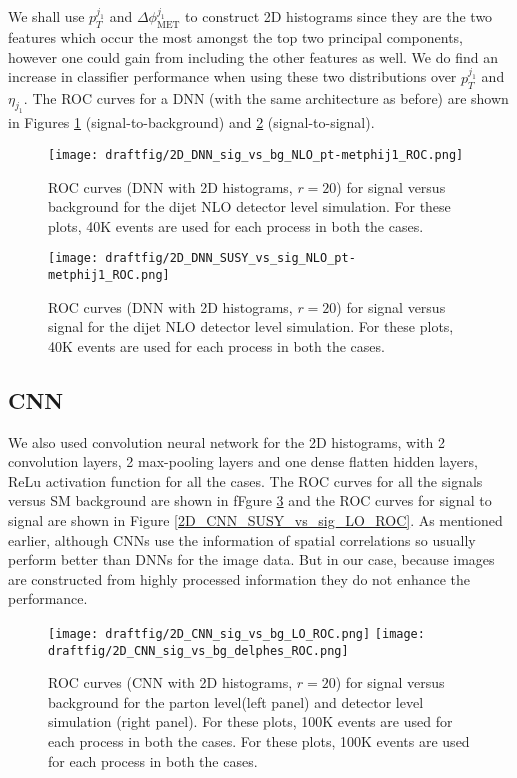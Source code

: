 \documentclass[aps,onecolumn,showpacs,superscriptaddress,groupedaddress,nofootinbib,preprint]{revtex4-1}
\begin{document}
We shall use $p_T^{j_1}$ and $\Delta \phi_{\text{MET}}^{j_1}$ to construct 2D histograms since they are the two features which occur the most amongst the top two principal components, however one could gain from including the other features as well. We do find an increase in classifier performance when using these two distributions over $p_T^{j_1}$ and $\eta_{j_1}$. The ROC curves for a DNN (with the same architecture as before) are shown in Figures \ref{2D_DNN_sig_vs_bg_NLO_ROC} (signal-to-background) and \ref{2D_DNN_sig_vs_sig_NLO_ROC} (signal-to-signal).

\begin{figure}%
\centering
\texttt{[image: draftfig/2D\_DNN\_sig\_vs\_bg\_NLO\_pt-metphij1\_ROC.png]}
\caption{ROC curves (DNN with 2D histograms, $r = 20$) for signal versus background for the dijet NLO detector level simulation. For these plots, 40K events are used for each process in both the cases.}\label{2D_DNN_sig_vs_bg_NLO_ROC}
\end{figure}

\begin{figure}%
\centering
\texttt{[image: draftfig/2D\_DNN\_SUSY\_vs\_sig\_NLO\_pt-metphij1\_ROC.png]}
\caption{ROC curves (DNN with 2D histograms, $r = 20$) for signal versus signal for the dijet NLO detector level simulation. For these plots, 40K events are used for each process in both the cases.}\label{2D_DNN_sig_vs_sig_NLO_ROC}
\end{figure}






\subsection{CNN}
We also used convolution neural network for the 2D histograms, with 2 convolution layers, 2 max-pooling layers and one dense 
flatten hidden layers, ReLu activation function for all the cases. The ROC curves for all the signals versus SM background are shown in fFgure \ref{2D_CNN_sig_vs_bg_LO_ROC} and the ROC curves for signal to signal are shown in Figure \ref{2D_CNN_SUSY_vs_sig_LO_ROC}. As mentioned earlier, although CNNs use the information of spatial correlations so usually perform better than DNNs for the image data. But in our case, because images are constructed from highly processed
information they do not enhance the performance. 


\begin{figure}%
\centering
\texttt{[image: draftfig/2D\_CNN\_sig\_vs\_bg\_LO\_ROC.png]}
\texttt{[image: draftfig/2D\_CNN\_sig\_vs\_bg\_delphes\_ROC.png]}
\caption{ROC curves (CNN with 2D histograms, $r = 20$) for signal versus background for the parton level(left panel) and detector level simulation (right panel). For these plots, 100K events are used for each process in both the cases. For these plots, 100K events are used for each process in both the cases.}\label{2D_CNN_sig_vs_bg_LO_ROC}
\end{figure}
\end{document}
